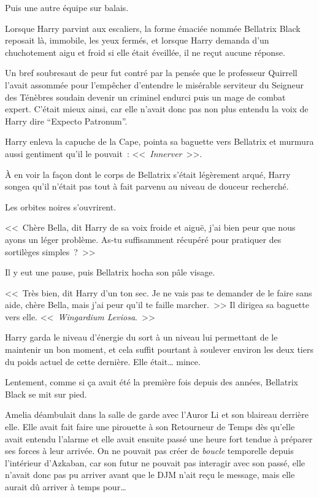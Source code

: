 Puis une autre équipe sur balais.

\later

Lorsque Harry parvint aux escaliers, la forme émaciée nommée Bellatrix Black reposait là, immobile, les yeux fermés, et lorsque Harry demanda d'un chuchotement aigu et froid si elle était éveillée, il ne reçut aucune réponse.

Un bref soubresaut de peur fut contré par la pensée que le professeur Quirrell l'avait assommée pour l'empêcher d'entendre le misérable serviteur du Seigneur des Ténèbres soudain devenir un criminel endurci puis un mage de combat expert. C'était mieux ainsi, car elle n'avait donc pas non plus entendu la voix de Harry dire “Expecto Patronum”.

Harry enleva la capuche de la Cape, pointa sa baguette vers Bellatrix et murmura aussi gentiment qu'il le pouvait~: <<~\emph{Innerver}~>>.

À en voir la façon dont le corps de Bellatrix s'était légèrement arqué, Harry songea qu'il n'était pas tout à fait parvenu au niveau de douceur recherché.

Les orbites noires s'ouvrirent.

<<~Chère Bella, dit Harry de sa voix froide et aiguë, j'ai bien peur que nous ayons un léger problème. As-tu suffisamment récupéré pour pratiquer des sortilèges simples~?~>>

Il y eut une pause, puis Bellatrix hocha son pâle visage.

<<~Très bien, dit Harry d'un ton sec. Je ne vais pas te demander de le faire sans aide, chère Bella, mais j'ai peur qu'il te faille marcher.~>> Il dirigea sa baguette vers elle. <<~\emph{Wingardium Leviosa}.~>>

Harry garda le niveau d'énergie du sort à un niveau lui permettant de le maintenir un bon moment, et cela suffit pourtant à soulever environ les deux tiers du poids actuel de cette dernière. Elle était… mince.

Lentement, comme si ça avait été la première fois depuis des années, Bellatrix Black se mit sur pied.

\later

Amelia déambulait dans la salle de garde avec l'Auror Li et son blaireau derrière elle. Elle avait fait faire une pirouette à son Retourneur de Temps dès qu'elle avait entendu l'alarme et elle avait ensuite passé une heure fort tendue à préparer ses forces à leur arrivée. On ne pouvait pas créer de \emph{boucle} temporelle depuis l'intérieur d'Azkaban, car son futur ne pouvait pas interagir avec son passé, elle n'avait donc pas pu arriver avant que le DJM n'ait reçu le message, mais elle aurait dû arriver à temps pour…


